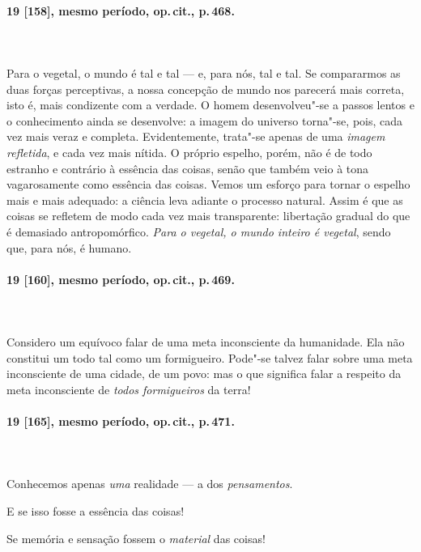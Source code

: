 \pagebreak
\paragraph*{19 [158], mesmo período, op.\,cit., p.\,468.}
\ \\
\ \\

Para o vegetal, o mundo é tal e tal --- e, para nós, tal e tal. Se
compararmos as duas forças perceptivas, a nossa concepção de mundo nos
parecerá mais correta, isto é, mais condizente com a verdade. O homem
desenvolveu"-se a passos lentos e o conhecimento ainda se desenvolve:
a imagem do universo torna"-se, pois, cada vez mais veraz e completa.
Evidentemente, trata"-se apenas de uma \textit{imagem refletida}, e
cada vez mais nítida. O próprio espelho, porém, não é de todo estranho
e contrário à essência das coisas, senão que também veio à tona
vagarosamente como essência das coisas. Vemos um esforço para tornar o
espelho mais e mais adequado: a ciência leva adiante o processo
natural. Assim é que as coisas se refletem de modo cada vez mais
transparente: libertação gradual do que é demasiado antropomórfico.
\textit{Para o vegetal, o mundo inteiro é vegetal}, sendo que, para
nós, é humano.

\pagebreak
\paragraph*{19 [160], mesmo período, op.\,cit., p.\,469.}
\ \\
\ \\

Considero um equívoco falar de uma meta inconsciente da humanidade. Ela
não constitui um todo tal como um formigueiro. Pode"-se talvez falar
sobre uma meta inconsciente de uma cidade, de um povo: mas o que
significa falar a respeito da meta inconsciente de \textit{todos
formigueiros} da terra!  

\pagebreak
\paragraph*{19 [165], mesmo período, op.\,cit., p.\,471.}
\ \\
\ \\

Conhecemos apenas \textit{uma} realidade --- a dos \textit{pensamentos}.

E se isso fosse a essência das coisas!

Se memória e sensação fossem o \textit{material} das coisas!

